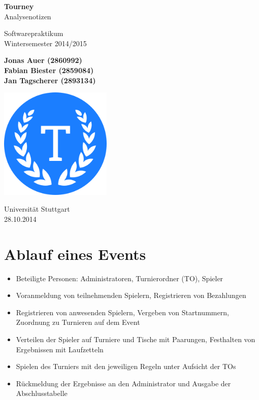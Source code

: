 \documentclass[11pt]{article}
\begin{document}
\begin{titlepage}
	\begin{center}
		\vspace*{1cm}

		\Huge
		\textbf{Tourney}\\
		Analysenotizen

		\vspace{0.5cm}
		\LARGE
		Softwarepraktikum\\
		\Large
		Wintersemester 2014/2015

		\vspace{1.5cm}

		\large
		\textbf{Jonas Auer (2860992)\\
				 Fabian Biester (2859084)\\
				 Jan Tagscherer (2893134)}

		\vfill

		\includegraphics[width=0.4\textwidth]{Logo.png}

		\vspace{1.5cm}

		\Large
		Universität Stuttgart\\
		28.10.2014
	\end{center}
\end{titlepage}

\newpage

\section{Ablauf eines Events}

\begin{itemize}
	\item Beteiligte Personen: Administratoren, Turnierordner (TO), Spieler
	\item Voranmeldung von teilnehmenden Spielern, Registrieren von Bezahlungen
	\item Registrieren von anwesenden Spielern, Vergeben von Startnummern, Zuordnung zu Turnieren auf dem Event
	\item Verteilen der Spieler auf Turniere und Tische mit Paarungen, Festhalten von Ergebnissen mit Laufzetteln
	\item Spielen des Turniers mit den jeweiligen Regeln unter Aufsicht der TOs
	\item Rückmeldung der Ergebnisse an den Administrator und Ausgabe der Abschlusstabelle
\end{itemize}
\end{document}
